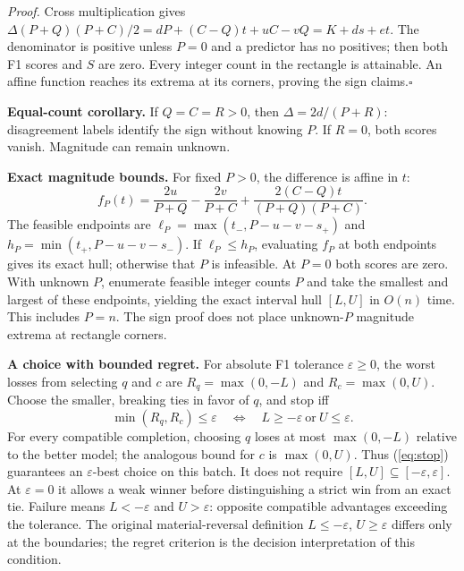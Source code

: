 \documentclass[a4paper]{esannV2}
\begin{document}
\noindent\textit{Proof.} Cross multiplication gives
$\Delta(P+Q)(P+C)/2=dP+(C-Q)t+uC-vQ=K+ds+et$.
The denominator is positive unless $P=0$ and a predictor has no positives;
then both F1 scores and $S$ are zero. Every integer count in the rectangle
is attainable. An affine function reaches its extrema at its corners,
proving the sign claims.\hfill$\square$

\smallskip\noindent\textbf{Equal-count corollary.}
If $Q=C=R>0$, then $\Delta=2d/(P+R)$: disagreement labels identify the sign
without knowing $P$. If $R=0$, both scores vanish. Magnitude can remain unknown.

\smallskip\noindent\textbf{Exact magnitude bounds.}
For fixed $P>0$, the difference is affine in $t$:
\begin{equation}\label{eq:fixed}
 f_P(t)=\frac{2u}{P+Q}-\frac{2v}{P+C}
          +\frac{2(C-Q)t}{(P+Q)(P+C)}.
\end{equation}
The feasible endpoints are
$\ell_P=\max(t_-,P-u-v-s_+)$ and
$h_P=\min(t_+,P-u-v-s_-)$.
If $\ell_P\le h_P$, evaluating $f_P$ at both endpoints gives its exact hull;
otherwise that $P$ is infeasible. At $P=0$ both scores are zero. With unknown
$P$, enumerate feasible integer counts $P$ and take the smallest and largest
of these endpoints, yielding the exact interval hull $[L,U]$ in $O(n)$ time.
This includes $P=n$. The sign proof does not place unknown-$P$
magnitude extrema at rectangle corners.

\smallskip\noindent\textbf{A choice with bounded regret.}
For absolute F1 tolerance $\varepsilon\ge0$, the worst losses from selecting
$q$ and $c$ are $R_q=\max(0,-L)$ and $R_c=\max(0,U)$.
Choose the smaller, breaking ties in favor of $q$, and stop iff
\begin{equation}\label{eq:stop}
 \min(R_q,R_c)\le\varepsilon
 \quad\Longleftrightarrow\quad L\ge-\varepsilon\ \text{or}\ U\le\varepsilon.
\end{equation}
For every compatible completion, choosing $q$ loses at most $\max(0,-L)$
relative to the better model; the analogous bound for $c$ is $\max(0,U)$.
Thus (\ref{eq:stop}) guarantees an $\varepsilon$-best choice on this batch.
It does not require $[L,U]\subseteq[-\varepsilon,\varepsilon]$.
At $\varepsilon=0$ it allows a weak winner before distinguishing a strict win
from an exact tie. Failure means $L<-\varepsilon$ and $U>\varepsilon$: opposite compatible
advantages exceeding the tolerance. The original material-reversal definition
$L\le-\varepsilon$, $U\ge\varepsilon$ differs only at the boundaries; the
regret criterion is the decision interpretation of this condition.
\end{document}

